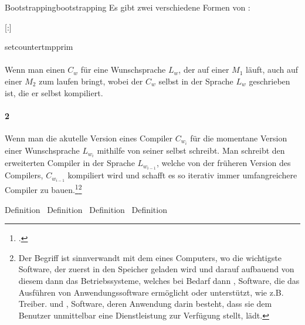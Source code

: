 \begin{Definition}{Bootstrapping}{bootstrapping}
  Es gibt zwei verschiedene Formen von :

  \setcounter{subdefcounter}{1}

  \titleformat{\paragraph}[runin]{\normalfont\normalsize\bfseries}{}{0mm}{}[:]

  setcounter{tmpprim}{\value{tcbcounter}}
  \paragraph{}\label{par:bootstrapping1}\hspace{-0.25cm}
  Wenn man einen  $C_w$ für eine Wunschsprache $L_w$, der auf einer  $M_1$ läuft, auch auf einer  $M_2$ zum laufen bringt, wobei der  $C_w$ selbst in der Sprache $L_w$ geschrieben ist, die er selbst kompiliert.


  \paragraph{2}\label{par:bootstrapping2}\hspace{-0.25cm}
  Wenn man die akutelle Version eines Compiler $C_{w_i}$ für die momentane Version einer Wunschsprache $L_{w_i}$ mithilfe von  seiner selbst schreibt. Man schreibt den erweiterten Compiler in der Sprache $L_{w_{i-1}}$, welche von der früheren Version des Compilers, $C_{w_{i-1}}$ kompiliert wird und schafft es so iterativ immer umfangreichere Compiler zu bauen.\footcite{earley_formalism_1970}\footnote{Der Begriff ist sinnverwandt mit dem  eines Computers, wo die wichtigste Software, der  zuerst in den Speicher geladen wird und darauf aufbauend von diesem dann das Betriebssysteme, welches bei Bedarf dann , Software, die das Ausführen von Anwendungssoftware ermöglicht oder unterstützt, wie z.B. Treiber. und , Software, deren Anwendung darin besteht, dass sie dem Benutzer unmittelbar eine Dienstleistung zur Verfügung stellt, lädt.}
\end{Definition}

Definition~
Definition~
Definition~
Definition~
